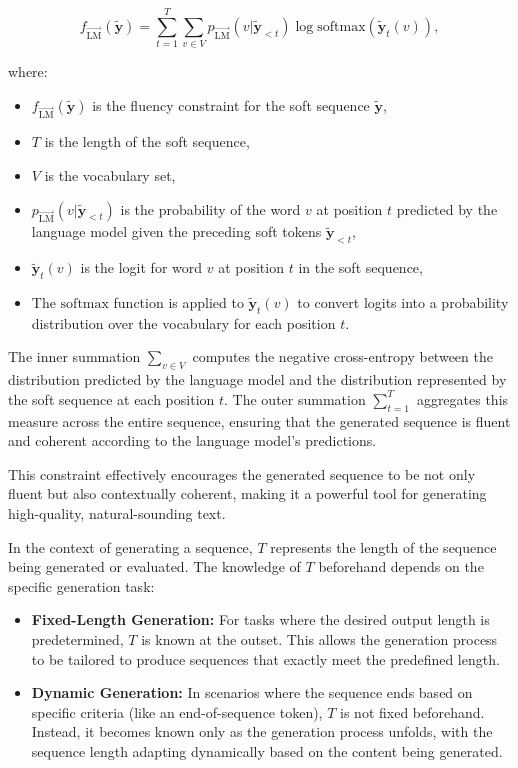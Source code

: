 \documentclass{article}
\begin{document}
\begin{equation}
    f_{\overrightarrow{\text{LM}}}(\mathbf{\tilde{y}}) = \sum_{t=1}^{T} \sum_{v \in V} p_{\overrightarrow{\text{LM}}}(v|\mathbf{\tilde{y}}_{<t}) \log \text{softmax} (\mathbf{\tilde{y}}_t(v)),
    \end{equation}
    

where:
\begin{itemize}
    \item \(f_{\overrightarrow{\text{LM}}}(\mathbf{\tilde{y}})\) is the fluency constraint for the soft sequence \(\mathbf{\tilde{y}}\),
    \item \(T\) is the length of the soft sequence,
    \item \(V\) is the vocabulary set,
    \item \(p_{\overrightarrow{\text{LM}}}(v|\mathbf{\tilde{y}}_{<t})\) is the probability of the word \(v\) at position \(t\) predicted by the language model given the preceding soft tokens \(\mathbf{\tilde{y}}_{<t}\),
    \item \(\mathbf{\tilde{y}}_t(v)\) is the logit for word \(v\) at position \(t\) in the soft sequence,
    \item The \(\text{softmax}\) function is applied to \(\mathbf{\tilde{y}}_t(v)\) to convert logits into a probability distribution over the vocabulary for each position \(t\).
\end{itemize}


The inner summation \(\sum_{v \in V}\) computes the negative cross-entropy between the distribution predicted by the language model and the distribution represented by the soft sequence at each position \(t\). The outer summation \(\sum_{t=1}^{T}\) aggregates this measure across the entire sequence, ensuring that the generated sequence is fluent and coherent according to the language model's predictions.

This constraint effectively encourages the generated sequence to be not only fluent but also contextually coherent, making it a powerful tool for generating high-quality, natural-sounding text.

In the context of generating a sequence, \(T\) represents the length of the sequence being generated or evaluated. The knowledge of \(T\) beforehand depends on the specific generation task:

\begin{itemize}
    \item \textbf{Fixed-Length Generation:} For tasks where the desired output length is predetermined, \(T\) is known at the outset. This allows the generation process to be tailored to produce sequences that exactly meet the predefined length.

    \item \textbf{Dynamic Generation:} In scenarios where the sequence ends based on specific criteria (like an end-of-sequence token), \(T\) is not fixed beforehand. Instead, it becomes known only as the generation process unfolds, with the sequence length adapting dynamically based on the content being generated.
\end{itemize}
\end{document}
